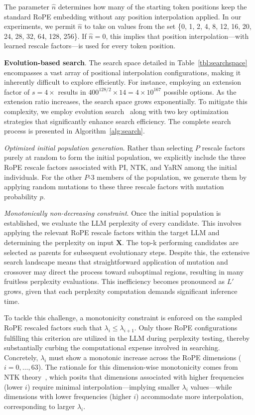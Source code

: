 The parameter $\hat{n}$ determines how many of the starting token positions keep the standard RoPE embedding without any position interpolation applied. In our experiments, we permit $\hat{n}$ to take on values from the set \{0, 1, 2, 4, 8, 12, 16, 20, 24, 28, 32, 64, 128, 256\}. If $\hat{n}=0$, this implies that position interpolation—with learned rescale factors—is used for every token position.

\textbf{Evolution-based search}. The search space detailed in Table~\ref{tbl:searchspace} encompasses a vast array of positional interpolation configurations, making it inherently difficult to explore efficiently. For instance, employing an extension factor of $s=4\times$ results in $400^{128/2}\times14=4\times10^{167}$ possible options. As the extension ratio increases, the search space grows exponentially. To mitigate this complexity, we employ evolution search~\cite{guo2020single} along with two key optimization strategies that significantly enhance search efficiency. The complete search process is presented in Algorithm~\ref{alg:search}.

\textit{Optimized initial population generation}. Rather than selecting $P$ rescale factors purely at random to form the initial population, we explicitly include the three RoPE rescale factors associated with PI, NTK, and YaRN among the initial individuals. For the other $P$-3 members of the population, we generate them by applying random mutations to these three rescale factors with mutation probability $p$.

\textit{Monotonically non-decreasing constraint}. Once the initial population is established, we evaluate the LLM perplexity of every candidate. This involves applying the relevant RoPE rescale factors within the target LLM and determining the perplexity on input $\mathbf{X}$. The top-k performing candidates are selected as parents for subsequent evolutionary steps. Despite this, the extensive search landscape means that straightforward application of mutation and crossover may direct the process toward suboptimal regions, resulting in many fruitless perplexity evaluations. This inefficiency becomes pronounced as $L'$ grows, given that each perplexity computation demands significant inference time.

To tackle this challenge, a monotonicity constraint is enforced on the sampled RoPE rescaled factors such that $\lambda_i \le \lambda_{i+1}$. Only those RoPE configurations fulfilling this criterion are utilized in the LLM during perplexity testing, thereby substantially curbing the computational expense involved in searching. Concretely, $\lambda_i$ must show a monotonic increase across the RoPE dimensions ($i=0,\ldots,63$). The rationale for this dimension-wise monotonicity comes from NTK theory~\cite{jacot2018neural,tancik2020fourier,ntk}, which posits that dimensions associated with higher frequencies (lower $i$) require minimal interpolation—implying smaller $\lambda_i$ values—while dimensions with lower frequencies (higher $i$) accommodate more interpolation, corresponding to larger $\lambda_i$.

